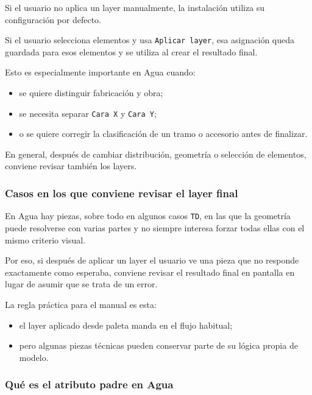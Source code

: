 Si el usuario no aplica un layer manualmente, la instalación utiliza su configuración por defecto.

Si el usuario selecciona elementos y usa \texttt{Aplicar layer}, esa asignación queda guardada para esos elementos y se utiliza al crear el resultado final.

Esto es especialmente importante en Agua cuando:

\begin{itemize}
\item se quiere distinguir fabricación y obra;
\item se necesita separar \texttt{Cara X} y \texttt{Cara Y};
\item o se quiere corregir la clasificación de un tramo o accesorio antes de finalizar.
\end{itemize}

En general, después de cambiar distribución, geometría o selección de elementos, conviene revisar también los layers.

\subsubsection{Casos en los que conviene revisar el layer final}

En Agua hay piezas, sobre todo en algunos casos \texttt{TD}, en las que la geometría puede resolverse con varias partes y no siempre interesa forzar todas ellas con el mismo criterio visual.

Por eso, si después de aplicar un layer el usuario ve una pieza que no responde exactamente como esperaba, conviene revisar el resultado final en pantalla en lugar de asumir que se trata de un error.

La regla práctica para el manual es esta:

\begin{itemize}
\item el layer aplicado desde paleta manda en el flujo habitual;
\item pero algunas piezas técnicas pueden conservar parte de su lógica propia de modelo.
\end{itemize}


\subsubsection{Qué es el atributo padre en Agua}

